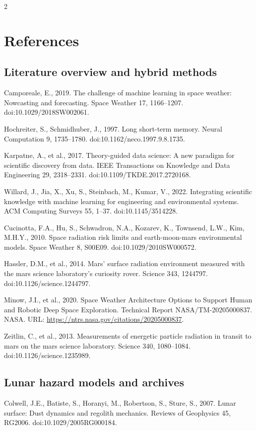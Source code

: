 \begin{multicols}{2}
\section*{References}

\subsection*{Literature overview and hybrid methods}
Camporeale, E., 2019. The challenge of machine learning in space weather: Nowcasting and forecasting. Space Weather 17, 1166--1207. doi:10.1029/2018SW002061.

Hochreiter, S., Schmidhuber, J., 1997. Long short-term memory. Neural Computation 9, 1735--1780. doi:10.1162/neco.1997.9.8.1735.

Karpatne, A., et al., 2017. Theory-guided data science: A new paradigm for scientific discovery from data. IEEE Transactions on Knowledge and Data Engineering 29, 2318--2331. doi:10.1109/TKDE.2017.2720168.

Willard, J., Jia, X., Xu, S., Steinbach, M., Kumar, V., 2022. Integrating scientific knowledge with machine learning for engineering and environmental systems. ACM Computing Surveys 55, 1--37. doi:10.1145/3514228.

Cucinotta, F.A., Hu, S., Schwadron, N.A., Kozarev, K., Townsend, L.W., Kim, M.H.Y., 2010. Space radiation risk limits and earth-moon-mars environmental models. Space Weather 8, S00E09. doi:10.1029/2010SW000572.

Hassler, D.M., et al., 2014. Mars' surface radiation environment measured with the mars science laboratory's curiosity rover. Science 343, 1244797. doi:10.1126/science.1244797.

Minow, J.I., et al., 2020. Space Weather Architecture Options to Support Human and Robotic Deep Space Exploration. Technical Report NASA/TM-20205000837. NASA. URL: \url{https://ntrs.nasa.gov/citations/20205000837}.

Zeitlin, C., et al., 2013. Measurements of energetic particle radiation in transit to mars on the mars science laboratory. Science 340, 1080--1084. doi:10.1126/science.1235989.

\subsection*{Lunar hazard models and archives}
Colwell, J.E., Batiste, S., Horanyi, M., Robertson, S., Sture, S., 2007. Lunar surface: Dust dynamics and regolith mechanics. Reviews of Geophysics 45, RG2006. doi:10.1029/2005RG000184.


\end{multicols}
